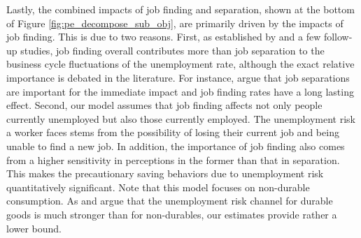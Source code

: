 Lastly, the combined impacts of job finding and separation, shown at the bottom of Figure \ref{fig:pe_decompose_sub_obj}, are primarily driven by the impacts of job finding. This is due to two reasons. First, as established by \cite{fujita2009cyclicality} and a few follow-up studies, job finding overall contributes more than job separation to the business cycle fluctuations of the unemployment rate, although the exact relative importance is debated in the literature. For instance, \cite{broer2021unemployment} argue that job separations are important for the immediate impact and job finding rates have a long lasting effect. Second, our model assumes that job finding affects not only people currently unemployed but also those currently employed. The unemployment risk a worker faces stems from the possibility of losing their current job and being unable to find a new job. In addition, the importance of job finding also comes from a higher sensitivity in perceptions in the former than that in separation. This makes the precautionary saving behaviors due to unemployment risk quantitatively significant. Note that this model focuses on non-durable consumption. As \cite{carroll1997unemployment} and \cite{harmenberg2021consumption} argue that the unemployment risk channel for durable goods is much stronger than for non-durables, our estimates provide rather a lower bound.


